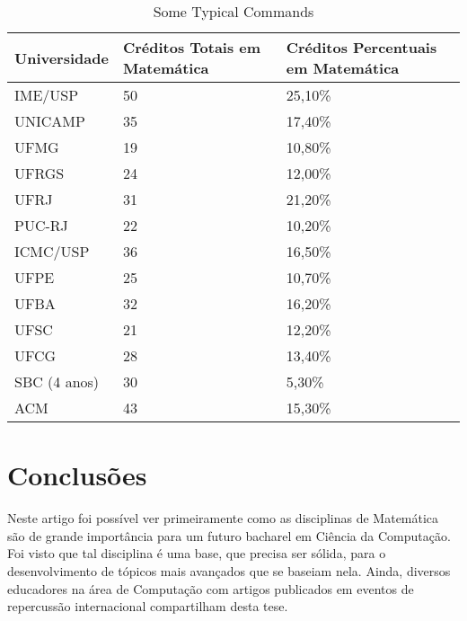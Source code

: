 \documentclass[conference]{IEEEtran}
\begin{document}
\begin{table}
	\centering
	\caption{Some Typical Commands}
    \begin{tabular}{|p{2cm}|p{2cm}|p{2cm}|}
        \hline
        Universidade & Créditos Totais em Matemática       & Créditos Percentuais em Matemática        \\ \hline
        IME/USP      & 50                                  & 25,10\%                                   \\ 
        UNICAMP      & 35                                  & 17,40\%                                   \\ 
        UFMG         & 19                                  & 10,80\%                                   \\ 
        UFRGS        & 24                                  & 12,00\%                                   \\ 
        UFRJ         & 31                                  & 21,20\%                                   \\ 
        PUC-RJ       & 22                                  & 10,20\%                                   \\ 
        ICMC/USP     & 36                                  & 16,50\%                                   \\ 
        UFPE         & 25                                  & 10,70\%                                   \\ 
        UFBA         & 32                                  & 16,20\%                                   \\ 
        UFSC         & 21                                  & 12,20\%                                   \\ 
        UFCG         & 28                                  & 13,40\%                                   \\ 
        SBC (4 anos) & 30                                  & 5,30\%                                    \\ 
        ACM          & 43                                  & 15,30\%                                   \\
        \hline
    \end{tabular}
\end{table}

\section{Conclusões}
	Neste artigo foi possível ver primeiramente como as disciplinas de Matemática são de grande importância para um futuro bacharel em Ciência da Computação. Foi visto que tal disciplina é uma base, que precisa ser sólida, para o desenvolvimento de tópicos mais avançados que se baseiam nela. Ainda, diversos educadores na área de Computação com artigos publicados em eventos de repercussão internacional compartilham desta tese.
	
\end{document}
